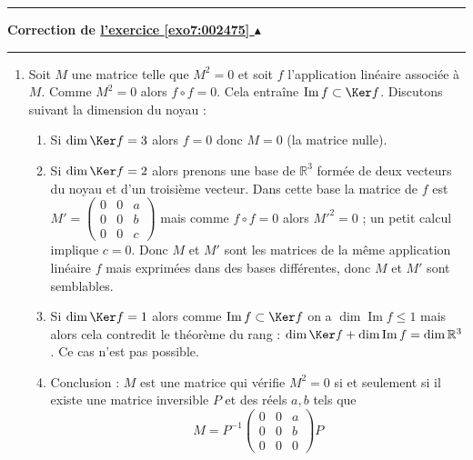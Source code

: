 \documentclass[11pt,a4paper]{article}
\newcommand{\Rr}{\mathbb{R}} \newcommand{\R}{\mathbb{R}}
\renewcommand{\Im}{\mathop{\mathrm{Im}}\nolimits}
\renewcommand{\le}{\leqslant} \renewcommand{\leq}{\leqslant}
\newcounter{exo}
\newcommand{\correction}[1]{\hypertarget{cor7:#1}{}\label{cor7:#1}{\bf Correction de \hyperlink{exo7:#1}{l'exercice \ref{exo7:#1} $\blacktriangle$}}\vspace{1mm}\hrule\vspace{1mm}}
\newcommand{\fincorrection}{\vspace{1mm}\hrule\vspace*{7mm}}
\begin{document}
\fincorrection
\correction{002475}
\begin{enumerate}
  \item Soit $M$ une matrice telle que $M^2=0$ et soit $f$ l'application linéaire associée à $M$.
Comme $M^2=0$ alors $f\circ f = 0$. Cela entraîne $\Im f \subset \Ker f$. Discutons suivant la dimension
du noyau :
   \begin{enumerate}
      \item Si $\dim \Ker f=3$ alors $f=0$ donc $M=0$ (la matrice nulle).

      \item Si $\dim \Ker f=2$ alors prenons une base de $\Rr^3$ formée de deux vecteurs du noyau et d'un troisième vecteur.
Dans cette base la matrice de $f$ est
$M'=\begin{pmatrix}0&0&a\\0& 0 & b\\0&0&c\end{pmatrix}$ mais comme $f\circ f=0$ alors $M'^2=0$ ;
un petit calcul implique $c=0$. Donc $M$ et $M'$ sont les matrices de la même application linéaire $f$ mais exprimées dans des bases différentes,
donc $M$ et $M'$ sont semblables.

      \item Si $\dim \Ker f=1$ alors comme $\Im f \subset \Ker f$ on a $\dim \Im f \le 1$ mais alors cela contredit le théorème
du rang : $\dim \Ker f + \dim \Im f = \dim \Rr^3$. Ce cas n'est pas possible.

      \item Conclusion : $M$ est une matrice qui vérifie $M^2=0$ si et seulement si 
il existe une matrice inversible $P$ et des réels $a,b$ tels que 
$$M=P^{-1} \begin{pmatrix}0&0&a\\0& 0 & b\\0&0&0\end{pmatrix}P$$

   \end{enumerate}


\end{enumerate}
\end{document}
